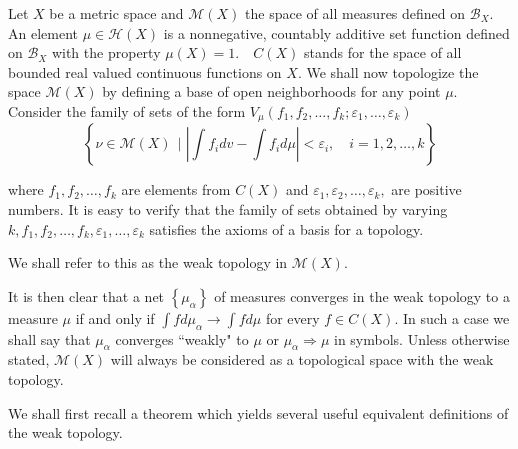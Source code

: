 Let \( X \) be a metric space and \( \mathscr { M } ( X ) \) the space of all measures defined on \( \mathscr { B } _ { X } . \) An element \( \mu \in \mathscr { H } ( X ) \) is a nonnegative, countably additive set function defined on \( \mathscr { B } _ { X } \) with the property \( \mu ( X ) = 1 . \quad C ( X ) \) stands for the space of all bounded real valued continuous functions on \( X \).  We shall now topologize the space \( \mathscr { M } ( X ) \) by defining a base of open neighborhoods for any point \( \mu . \) Consider the family of sets of the form
\( V _ { \mu } \left( f _ { 1 } , f _ { 2 } , \ldots , f _ { k } ; \varepsilon _ { 1 } , \ldots , \varepsilon _ { k } \right) \)
\[ \left\{\nu \in \mathscr { M } ( X ) \, \mid  \left| \int f _ { i } d v - \int f _ { i } d \mu \right| < \varepsilon _ { i } , \quad i = 1,2 , \ldots , k \right\} \]

where \( f _ { 1 } , f _ { 2 } , \ldots , f _ { k } \) are elements from \( C ( X ) \) and \( \varepsilon _ { 1 } , \varepsilon _ { 2 } , \ldots , \varepsilon _ { k } , \) are positive numbers. It is easy to verify that the family of sets obtained by varying \( k , f _ { 1 } , f _ { 2 } , \ldots , f _ { k } , \varepsilon _ { 1 } , \ldots , \varepsilon _ { k } \) satisfies the axioms of a basis for a topology.

\begin{defn}
	We shall refer to this as the weak topology  in \( \mathscr { M } ( X ) \).
\end{defn}

It is then clear that a net \( \left\{ \mu _ { \alpha } \right\} \) of measures converges in the weak topology to a measure \( \mu \) if and only if \( \int f d \mu _ { \alpha } \rightarrow \int f d \mu \) for every \( f \in C ( X ) . \) In such a case we shall say that \( \mu _ { \alpha } \) converges ``weakly" to \( \mu \) or \( \mu _ { \alpha } \Rightarrow \mu \) in symbols. Unless otherwise stated, \( \mathscr { M } ( X ) \) will always be considered as a topological space with the weak topology.

We shall first recall a theorem which yields several useful equivalent definitions of the weak topology.

